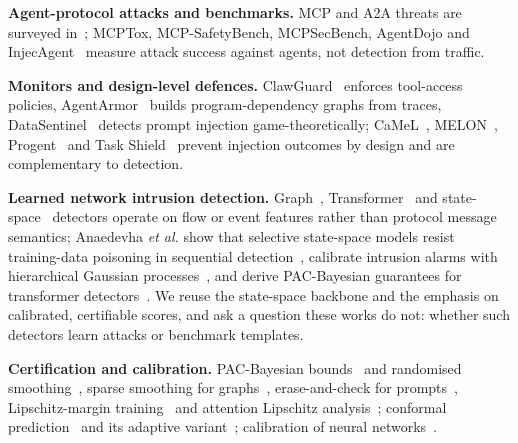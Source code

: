 \documentclass[conference,compsoc]{IEEEtran}
\begin{document}
\textbf{Agent-protocol attacks and benchmarks.} MCP and A2A threats are surveyed in~\cite{Hou2025MCP,Lotfi2026A2ABreak}; MCPTox, MCP-SafetyBench, MCPSecBench, AgentDojo and InjecAgent~\cite{Wang2025MCPTox,Zong2026SafetyBench,Yang2025MCPSec,Debenedetti2024AgentDojo,Zhan2024InjecAgent} measure attack success against agents, not detection from traffic.

\textbf{Monitors and design-level defences.} ClawGuard~\cite{Zhao2026ClawGuard} enforces tool-access policies, AgentArmor~\cite{Wang2025AgentArmor} builds program-dependency graphs from traces, DataSentinel~\cite{Liu2025DataSentinel} detects prompt injection game-theoretically; CaMeL~\cite{Debenedetti2025CaMeL}, MELON~\cite{Zhu2025MELON}, Progent~\cite{Shi2025Progent} and Task Shield~\cite{TaskShield2024} prevent injection outcomes by design and are complementary to detection.

\textbf{Learned network intrusion detection.} Graph~\cite{Lo2022EGraphSAGE}, Transformer~\cite{Wu2022RTIDS} and state-space~\cite{Wang2025NetMamba,Anaedevha2026MambaShield} detectors operate on flow or event features rather than protocol message semantics; Anaedevha \textit{et al.} show that selective state-space models resist training-data poisoning in sequential detection~\cite{Anaedevha2026MambaShield}, calibrate intrusion alarms with hierarchical Gaussian processes~\cite{Anaedevha2026HGP}, and derive PAC-Bayesian guarantees for transformer detectors~\cite{Anaedevha2026PACBayes}. We reuse the state-space backbone and the emphasis on calibrated, certifiable scores, and ask a question these works do not: whether such detectors learn attacks or benchmark templates.

\textbf{Certification and calibration.} PAC-Bayesian bounds~\cite{Anaedevha2026PACBayes} and randomised smoothing~\cite{Cohen2019RandSmooth}, sparse smoothing for graphs~\cite{Bojchevski2020Sparse,Schuchardt2023Localized,Schuchardt2023Hierarchical}, erase-and-check for prompts~\cite{Kumar2024EraseCheck}, Lipschitz-margin training~\cite{Tsuzuku2018LipMargin,Fazlyab2019LipSDP} and attention Lipschitz analysis~\cite{Kim2021LipAttn,Dasoulas2021LipNorm}; conformal prediction~\cite{Vovk2005ALRW} and its adaptive variant~\cite{Gibbs2021ACI}; calibration of neural networks~\cite{Guo2017Calibration}. 

\end{document}
